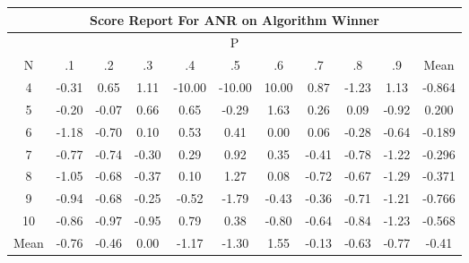 \documentclass[11pt,a4paper]{report}
\begin{document}
\begin{longtable}{ | c || c | c | c | c | c | c | c | c | c || c |}
\hline
\multicolumn{11}{|c|}{ Score Report For ANR on Algorithm Winner} \\
\hline
\multicolumn{11}{|c|}{ P } \\
\hline
N & .1 & .2 & .3 & .4 & .5 & .6 & .7 & .8 & .9 & Mean\\
 \hline
 \hline
 \endhead
  4 &  \cellcolor[HTML]{FFF7F7} -0.31 &  \cellcolor[HTML]{EFEFFF} 0.65 &  \cellcolor[HTML]{E7E7FF} 1.11 &  \cellcolor[HTML]{FF0000} -10.00 &  \cellcolor[HTML]{FF0000} -10.00 &  \cellcolor[HTML]{0808FF} 10.00 &  \cellcolor[HTML]{E7E7FF} 0.87 &  \cellcolor[HTML]{FFDFDF} -1.23 &  \cellcolor[HTML]{DFDFFF} 1.13 & -0.864 \\
  5 &  \cellcolor[HTML]{FFF7F7} -0.20 &  \cellcolor[HTML]{FFFFFF} -0.07 &  \cellcolor[HTML]{EFEFFF} 0.66 &  \cellcolor[HTML]{EFEFFF} 0.65 &  \cellcolor[HTML]{FFF7F7} -0.29 &  \cellcolor[HTML]{D7D7FF} 1.63 &  \cellcolor[HTML]{F7F7FF} 0.26 &  \cellcolor[HTML]{FFFFFF} 0.09 &  \cellcolor[HTML]{FFE7E7} -0.92 & 0.200 \\
  6 &  \cellcolor[HTML]{FFDFDF} -1.18 &  \cellcolor[HTML]{FFEFEF} -0.70 &  \cellcolor[HTML]{FFFFFF} 0.10 &  \cellcolor[HTML]{EFEFFF} 0.53 &  \cellcolor[HTML]{F7F7FF} 0.41 &  \cellcolor[HTML]{FFFFFF} 0.00 &  \cellcolor[HTML]{FFFFFF} 0.06 &  \cellcolor[HTML]{FFF7F7} -0.28 &  \cellcolor[HTML]{FFEFEF} -0.64 & -0.189 \\
  7 &  \cellcolor[HTML]{FFEFEF} -0.77 &  \cellcolor[HTML]{FFEFEF} -0.74 &  \cellcolor[HTML]{FFF7F7} -0.30 &  \cellcolor[HTML]{F7F7FF} 0.29 &  \cellcolor[HTML]{E7E7FF} 0.92 &  \cellcolor[HTML]{F7F7FF} 0.35 &  \cellcolor[HTML]{FFF7F7} -0.41 &  \cellcolor[HTML]{FFEFEF} -0.78 &  \cellcolor[HTML]{FFDFDF} -1.22 & -0.296 \\
  8 &  \cellcolor[HTML]{FFE7E7} -1.05 &  \cellcolor[HTML]{FFEFEF} -0.68 &  \cellcolor[HTML]{FFF7F7} -0.37 &  \cellcolor[HTML]{FFFFFF} 0.10 &  \cellcolor[HTML]{DFDFFF} 1.27 &  \cellcolor[HTML]{FFFFFF} 0.08 &  \cellcolor[HTML]{FFEFEF} -0.72 &  \cellcolor[HTML]{FFEFEF} -0.67 &  \cellcolor[HTML]{FFDFDF} -1.29 & -0.371 \\
  9 &  \cellcolor[HTML]{FFE7E7} -0.94 &  \cellcolor[HTML]{FFEFEF} -0.68 &  \cellcolor[HTML]{FFF7F7} -0.25 &  \cellcolor[HTML]{FFEFEF} -0.52 &  \cellcolor[HTML]{FFCFCF} -1.79 &  \cellcolor[HTML]{FFF7F7} -0.43 &  \cellcolor[HTML]{FFF7F7} -0.36 &  \cellcolor[HTML]{FFEFEF} -0.71 &  \cellcolor[HTML]{FFDFDF} -1.21 & -0.766 \\
  10 &  \cellcolor[HTML]{FFE7E7} -0.86 &  \cellcolor[HTML]{FFE7E7} -0.97 &  \cellcolor[HTML]{FFE7E7} -0.95 &  \cellcolor[HTML]{EFEFFF} 0.79 &  \cellcolor[HTML]{F7F7FF} 0.38 &  \cellcolor[HTML]{FFE7E7} -0.80 &  \cellcolor[HTML]{FFEFEF} -0.64 &  \cellcolor[HTML]{FFE7E7} -0.84 &  \cellcolor[HTML]{FFDFDF} -1.23 & -0.568 \\
 \hline
 \hline
Mean &  \cellcolor[HTML]{FFEFEF} -0.76 &  \cellcolor[HTML]{FFF7F7} -0.46 &  \cellcolor[HTML]{FFFFFF} 0.00 &  \cellcolor[HTML]{FFDFDF} -1.17 &  \cellcolor[HTML]{FFDFDF} -1.30 &  \cellcolor[HTML]{D7D7FF} 1.55 &  \cellcolor[HTML]{FFFFFF} -0.13 &  \cellcolor[HTML]{FFEFEF} -0.63 &  \cellcolor[HTML]{FFEFEF} -0.77 &  \cellcolor[HTML]{FFF7F7} -0.41
\end{longtable}
\end{document}

